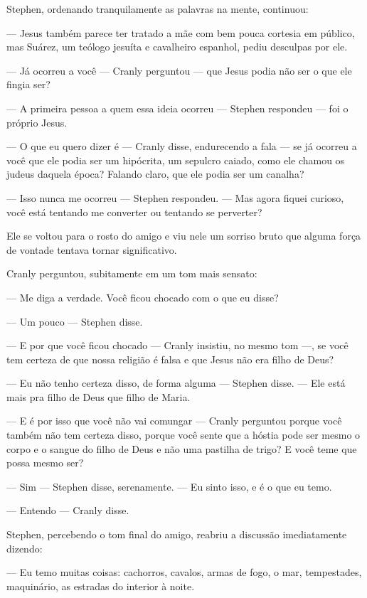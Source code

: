 Stephen, ordenando tranquilamente as palavras na mente, continuou:

 --- Jesus também parece ter tratado a mãe com bem pouca cortesia em
público, mas Suárez, um teólogo jesuíta e cavalheiro espanhol, pediu
desculpas por ele.

 --- Já ocorreu a você --- Cranly perguntou --- que Jesus podia não ser o que ele
fingia ser?

 --- A primeira pessoa a quem essa ideia ocorreu --- Stephen respondeu --- foi o
próprio Jesus.

 --- O que eu quero dizer é --- Cranly disse, endurecendo a fala --- se já ocorreu a
você que ele podia ser um hipócrita, um sepulcro caiado, como ele
chamou os judeus daquela época? Falando claro, que ele podia ser um
canalha?

 --- Isso nunca me ocorreu --- Stephen respondeu. --- Mas agora fiquei curioso,
você está tentando me converter ou tentando se perverter?

Ele se voltou para o rosto do amigo e viu nele um sorriso bruto que
alguma força de vontade tentava tornar significativo.

Cranly perguntou, subitamente em um tom mais sensato:

 --- Me diga a verdade. Você ficou chocado com o que eu disse?

 --- Um pouco --- Stephen disse.

 --- E por que você ficou chocado --- Cranly insistiu, no mesmo tom ---,  se você
tem certeza de que nossa religião é falsa e que Jesus não era filho de
Deus?

 --- Eu não tenho certeza disso, de forma alguma --- Stephen disse. --- Ele está
mais pra filho de Deus que filho de Maria.

 --- E é por isso que você não vai comungar --- Cranly perguntou  porque você
também não tem certeza disso, porque você sente que a hóstia pode ser
mesmo o corpo e o sangue do filho de Deus e não uma pastilha de trigo?
E você teme que possa mesmo ser?

 --- Sim --- Stephen disse, serenamente. --- Eu sinto isso, e é o que eu temo.

 --- Entendo --- Cranly disse.

Stephen, percebendo o tom final do amigo, reabriu a discussão
imediatamente dizendo:

 --- Eu temo muitas coisas: cachorros, cavalos, armas de fogo, o mar,
tempestades, maquinário, as estradas do interior à noite.

